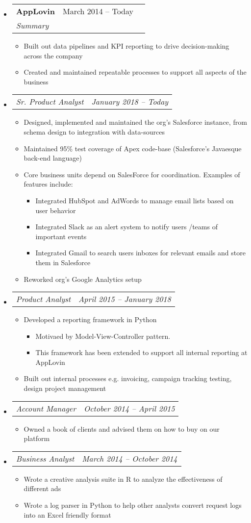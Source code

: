 \documentclass{article}
\newcommand{\resumeheading}[1]{
    \noindent
    \fcolorbox{mygrey}{mygrey}{%
        \parbox{\dimexpr\linewidth-2\fboxsep-2\fboxrule}{\large#1}}
}
\newcommand{\splitresumesubheading}[3]{
    \begin{tabularx}{\linewidth}{XcX}
	    	\textbf{#1} & #2 \\
		    \textit{#3}
    \end{tabularx}
    \vspace{-3ex}
}
\newcommand{\resumesubsubheading}[2]{
    \begin{tabularx}{\linewidth}{Xc}
		\textit{#1} & \textit{#2} \\
    \end{tabularx}
    \vspace{-4ex}
}
\newcommand{\resumeitem}[1]{
    \item #1 
    \vspace{-2pt}
}
\begin{document}
\resumeheading{Experience}
\begin{itemize}
    \item \splitresumesubheading{AppLovin}{March 2014 -- Today}
                                {Summary}
    \begin{itemize}
        \resumeitem{Built out data pipelines and KPI reporting to drive decision-making across the company}
        \resumeitem{Created and maintained repeatable processes to support all aspects of the business}
    \end{itemize}
    \item \resumesubsubheading{Sr. Product Analyst}{January 2018 -- Today}
    \begin{itemize}
        \resumeitem{Designed, implemented and maintained the org’s Salesforce instance, from schema design to integration with data-sources}
        \resumeitem{Maintained 95\% test coverage of Apex code-base (Salesforce's Javaesque back-end language)}
        \resumeitem{Core business units depend on SalesForce for coordination. Examples of features include:}
        \vspace{0ex}
        \begin{itemize}
            \resumeitem{Integrated HubSpot and AdWords to manage email lists based on user behavior}
            \resumeitem{Integrated Slack as an alert system to notify users /teams of important events}
            \resumeitem{Integrated Gmail to search users inboxes for relevant emails and store them in Salesforce}
        \end{itemize}
        \resumeitem{Reworked org’s Google Analytics setup}
    \end{itemize}
    \item \resumesubsubheading{Product Analyst}{April 2015 -- January 2018}
    \begin{itemize}
        \resumeitem{Developed a reporting framework in Python}
        \begin{itemize}
            \resumeitem{Motivaed by Model-View-Controller pattern.}
            \resumeitem{This framework has been extended to support all internal reporting at AppLovin}
        \end{itemize}
        \resumeitem{Built out internal processes e.g. invoicing, campaign tracking testing, design project management}
    \end{itemize}
    \item \resumesubsubheading{Account Manager}{October 2014 -- April 2015}
    \begin{itemize}
        \resumeitem{Owned a book of clients and advised them on how to buy on our platform}
    \end{itemize}
    \item \resumesubsubheading{Business Analyst}{March 2014 -- October 2014}
    \begin{itemize}
        \resumeitem{Wrote a creative analysis suite in R to analyze the effectiveness of different ads}
        \resumeitem{Wrote a log parser in Python to help other analysts convert request logs into an Excel friendly format}
    \end{itemize}
\end{itemize}
\end{document}
